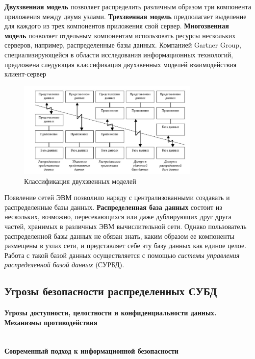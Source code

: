 \textbf{Двухзвенная модель} позволяет распределить различным образом три компонента приложения между двумя узлами.
\textbf{Трехзвенная модель} предполагает выделение для каждого из трех компонентов приложения свой сервер.
\textbf{Многозвенная модель} позволяет отдельным компонентам использовать ресурсы нескольких серверов, например,
распределенные базы данных. Компанией Gartner Group, специализирующейся в области исследования информационных технологий,
предложена следующая классификация двухзвенных моделей взаимодействия клиент-сервер \autocite{dce}
\begin{figure}[h!]
    \centering
    \includegraphics[width=0.8\textwidth]{assets/dce.jpg}
    \caption{Классификация двухзвенных моделей}
\end{figure}

Появление сетей ЭВМ позволило наряду с централизованными создавать и распределенные базы данных.
\textbf{Распределенная база данных} состоит из нескольких, возможно, пересекающихся или да­же дублирующих друг друга
частей, хранимых в различных ЭВМ вычислительной сети. Однако пользователь распределенной базы данных не обязан
знать, каким образом ее компоненты размещены в узлах сети, и представляет себе эту базу данных как единое
це­лое. Работа с такой базой данных осуществляется с помощью \textit{сис­темы управления распределенной базой данных} (СУРБД).
\\

\subsection{Угрозы безопасности распределенных СУБД}
\paragraph{Угрозы доступности, целостности и конфиденциальности данных. Механизмы противодействия} ~\\

\textbf{Современный подход к информационной безопасности}

